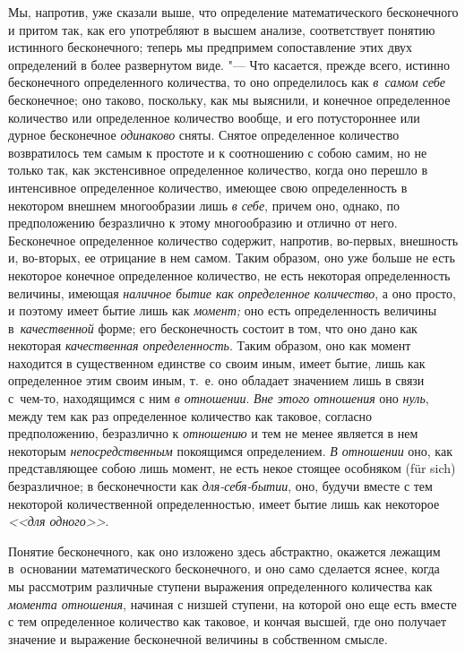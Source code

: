 Мы, напротив, уже сказали выше, что определение математического бесконечного и
притом так, как его употребляют в высшем анализе, соответствует понятию
истинного бесконечного; теперь мы предпримем сопоставление этих двух
определений в более развернутом виде. "--- Что касается, прежде всего, истинно
бесконечного определенного количества, то оно определилось как {\em в~самом
себе} бесконечное; оно таково, поскольку, как мы выяснили, и конечное
определенное количество или определенное количество вообще, и его потустороннее
или дурное бесконечное {\em одинаково} сняты. Снятое определенное количество
возвратилось тем самым к простоте и к соотношению с собою самим, но не только
так, как экстенсивное определенное количество, когда оно перешло в интенсивное
определенное количество, имеющее свою определенность в некотором внешнем
многообразии лишь {\em в себе}, причем оно, однако, по предположению
безразлично к этому многообразию и отлично от него. Бесконечное определенное
количество содержит, напротив, во-первых, внешность и, во-вторых, ее отрицание
в нем самом. Таким образом, оно уже больше не есть некоторое конечное
определенное количество, не есть некоторая определенность величины, имеющая
{\em наличное бытие как определенное количество}, а оно просто, и поэтому имеет
бытие лишь как {\em момент;} оно есть определенность величины
в~{\em качественной} форме; его бесконечность состоит в том, что оно дано как
некоторая {\em качественная определенность}. Таким образом, оно как момент
находится в существенном единстве со своим иным, имеет бытие, лишь как
определенное этим своим иным, т.~е. оно обладает значением лишь в связи
с~чем-то, находящимся с ним {\em в отношении}. {\em Вне этого отношения} оно
{\em нуль}, между тем как раз определенное количество как таковое, согласно
предположению, безразлично к {\em отношению} и тем не менее является в нем
некоторым {\em непосредственным} покоящимся определением. {\em В отношении}
оно, как представляющее собою лишь момент, не есть некое стоящее особняком
(für sich) безразличное; в бесконечности как {\em для-себя-бытии}, оно, будучи
вместе с тем некоторой количественной определенностью, имеет бытие лишь как
некоторое {\em <<для одного>>}.

Понятие бесконечного, как оно изложено здесь абстрактно, окажется лежащим
в~основании математического бесконечного, и оно само сделается яснее, когда
мы рассмотрим различные ступени выражения определенного количества как
{\em момента отношения}, начиная с низшей ступени, на которой оно еще есть
вместе с тем определенное количество как таковое, и кончая высшей, где оно
получает значение и выражение бесконечной величины в собственном смысле.


